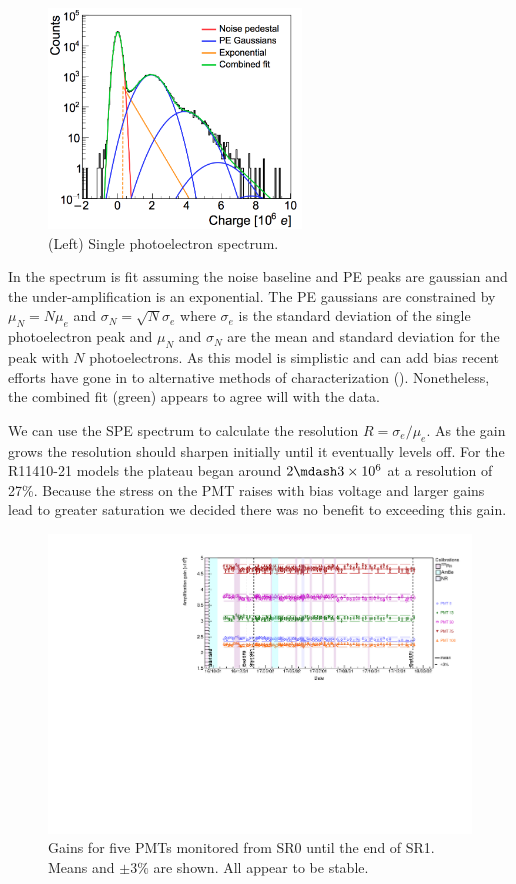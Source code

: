{\begin{figure}
\centering
\includegraphics[width=0.6\textwidth]{SPESpectrum}
\caption{(Left) Single photoelectron spectrum.}
\label{fig:xenon1t_pmt_spe}
\end{figure}

In  the spectrum is fit assuming the noise baseline and PE peaks are gaussian and the under-amplification is
an exponential.  The PE gaussians are constrained by $\mu_{N} = N \mu_{e}$ and $\sigma_{N} = \sqrt{N} \sigma_{e}$ where $\sigma_{e}$ is the
standard deviation of the single photoelectron peak and $\mu_{N}$ and $\sigma_{N}$ are the mean and standard deviation for the peak with
$N$ photoelectrons.  As this model is simplistic and can add bias recent efforts have gone in to alternative methods
of characterization ().  Nonetheless, the combined fit (green) appears to agree will with the data.

We can use the SPE spectrum to calculate the resolution $R = \sigma_{e} / \mu_{e}$.  As the gain grows the resolution should sharpen
initially until it eventually levels off.  For the R11410-21 models the plateau began around $2 \mdash 3 \times 10^{6}$ at a resolution of
27\%.  Because the stress on the PMT raises with bias voltage and larger gains lead to greater saturation we decided there was no benefit
to exceeding this gain.

\begin{figure}
\centering
\includegraphics[width=\textwidth]{PMTGainStability}
\caption{Gains for five PMTs monitored from SR0 until the end of SR1.  Means and $\pm 3\%$ are shown.  All appear to be stable.}
\label{fig:xenon1t_pmt_time}
\end{figure}

}
